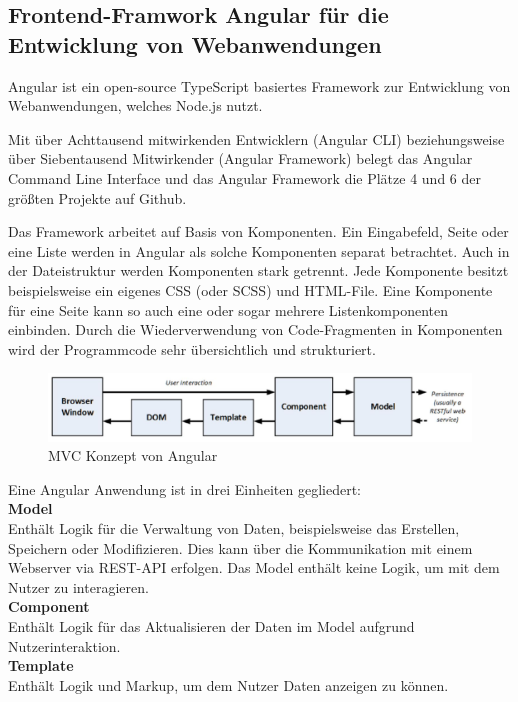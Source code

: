 \subsection{Frontend-Framwork Angular für die Entwicklung von Webanwendungen}

Angular ist ein open-source TypeScript basiertes Framework zur Entwicklung von Webanwendungen, welches Node.js nutzt.


Mit über Achttausend mitwirkenden Entwicklern (Angular CLI) beziehungsweise über Siebentausend Mitwirkender (Angular Framework) belegt das Angular Command Line Interface und das Angular Framework die Plätze 4 und 6 der größten Projekte auf Github. 
\cite{OctoverseGitHubStatistics}

Das Framework arbeitet auf Basis von Komponenten. Ein Eingabefeld, Seite oder eine Liste werden in Angular als solche Komponenten separat betrachtet. Auch in der Dateistruktur werden Komponenten stark getrennt. Jede Komponente besitzt beispielsweise ein eigenes CSS (oder SCSS) und HTML-File. Eine Komponente für eine Seite kann so auch eine oder sogar mehrere Listenkomponenten einbinden. Durch die Wiederverwendung von Code-Fragmenten in Komponenten wird der Programmcode sehr übersichtlich und strukturiert.

\begin{figure}[h!]
        \includegraphics[width=\linewidth]{img/Angular_MVC.JPG}
        \centering
        \caption{MVC Konzept von Angular \cite[S. 35, Abbildung 3-4]{ProAngular}}
        \label{fig:angularmvc}
\end{figure}

Eine Angular Anwendung ist in drei Einheiten gegliedert:\\

\textbf{Model}\\ 
Enthält Logik für die Verwaltung von Daten, beispielsweise das Erstellen, Speichern oder Modifizieren. Dies kann über die Kommunikation mit einem Webserver via REST-API erfolgen. Das Model enthält keine Logik, um mit dem Nutzer zu interagieren.\\

\textbf{Component}\\
Enthält Logik für das Aktualisieren der Daten im Model aufgrund Nutzerinteraktion. \\

\textbf{Template}\\ 
Enthält Logik und Markup, um dem Nutzer Daten anzeigen zu können.

\cite{ProAngular}